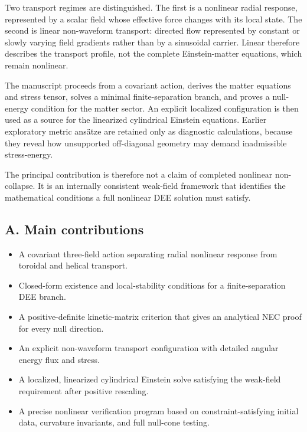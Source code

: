 Two transport regimes are distinguished. The first is a nonlinear radial
response, represented by a scalar field whose effective force changes
with its local state. The second is linear non-waveform transport:
directed flow represented by constant or slowly varying field gradients
rather than by a sinusoidal carrier.
\textquotesingle Linear\textquotesingle{} therefore describes the
transport profile, not the complete Einstein-matter equations, which
remain nonlinear.

The manuscript proceeds from a covariant action, derives the matter
equations and stress tensor, solves a minimal finite-separation branch,
and proves a null-energy condition for the matter sector. An explicit
localized configuration is then used as a source for the linearized
cylindrical Einstein equations. Earlier exploratory metric ansätze are
retained only as diagnostic calculations, because they reveal how
unsupported off-diagonal geometry may demand inadmissible stress-energy.

The principal contribution is therefore not a claim of completed
nonlinear non-collapse. It is an internally consistent weak-field
framework that identifies the mathematical conditions a full nonlinear
DEE solution must satisfy.

\subsection{A. Main contributions}\label{a.-main-contributions}

\begin{itemize}
\item
  A covariant three-field action separating radial nonlinear response
  from toroidal and helical transport.
\item
  Closed-form existence and local-stability conditions for a
  finite-separation DEE branch.
\item
  A positive-definite kinetic-matrix criterion that gives an analytical
  NEC proof for every null direction.
\item
  An explicit non-waveform transport configuration with detailed angular
  energy flux and stress.
\item
  A localized, linearized cylindrical Einstein solve satisfying the
  weak-field requirement after positive rescaling.
\item
  A precise nonlinear verification program based on
  constraint-satisfying initial data, curvature invariants, and full
  null-cone testing.
\end{itemize}

